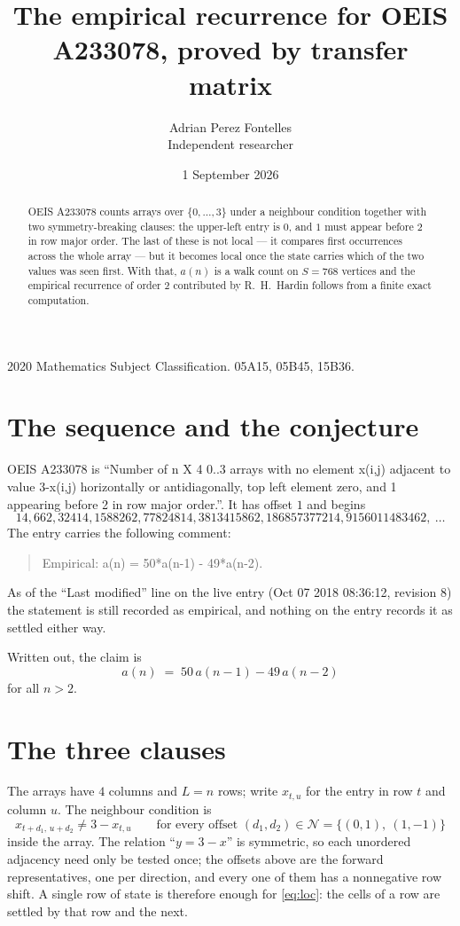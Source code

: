 \documentclass[11pt,a4paper]{article}
\title{The empirical recurrence for OEIS A233078, proved by transfer matrix}
\author{Adrian Perez Fontelles\\ \small Independent researcher}
\date{1 September 2026}
\theoremstyle{plain}
\theoremstyle{definition}
\begin{document}
\maketitle

\begin{abstract}
OEIS A233078 counts arrays over $\{0,\dots,3\}$ under a neighbour condition together with
two symmetry-breaking clauses: the upper-left entry is $0$, and $1$ must appear before
$2$ in row major order. The last of these is not local --- it compares first occurrences
across the whole array --- but it becomes local once the state carries which of the two values
was seen first. With that, $a(n)$ is a walk count on $S=768$ vertices and the empirical
recurrence of order $2$ contributed by R.~H.~Hardin follows from a finite exact
computation.
\end{abstract}

\noindent\small 2020 Mathematics Subject Classification. 05A15, 05B45, 15B36.\normalsize

\section{The sequence and the conjecture}

OEIS A233078 is ``Number of n X 4 0..3 arrays with no element x(i,j) adjacent to value 3-x(i,j) horizontally or antidiagonally, top left element zero, and 1 appearing before 2 in row major order.''. It has offset $1$ and begins
\[
14, 662, 32414, 1588262, 77824814, 3813415862, 186857377214, 9156011483462,\ \dots
\]
The entry carries the following comment:
\begin{quote}\small
Empirical: a(n) = 50*a(n-1) - 49*a(n-2).
\end{quote}
As of the ``Last modified'' line on the live entry (Oct 07 2018 08:36:12, revision 8) the statement is
still recorded as empirical, and nothing on the entry records it as settled either way.

Written out, the claim is
\begin{equation}\label{eq:conj}
a(n)\;=\;50\,a(n-1) - 49\,a(n-2)
\end{equation}
for all $n>2$.

\section{The three clauses}

The arrays have $4$ columns and $L=n$ rows; write $x_{t,u}$ for the entry in
row $t$ and column $u$. The neighbour condition is
\begin{equation}\label{eq:loc}
x_{t+d_1,\,u+d_2}\ne 3-x_{t,u}\qquad\text{for every offset }(d_1,d_2)\in\mathcal N=\{(0,1),\ (1,-1)\}
\end{equation}
inside the array. The relation ``$y=3-x$'' is symmetric, so each unordered adjacency need
only be tested once; the offsets above are the forward representatives, one per direction,
and every one of them has a nonnegative row shift. A single row of state is therefore
enough for \eqref{eq:loc}: the cells of a row are settled by that row and the next.
\end{document}
